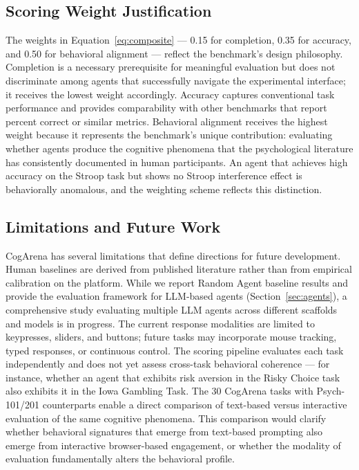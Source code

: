 \documentclass{article}
\begin{document}
\subsection{Scoring Weight Justification}

The weights in Equation~\ref{eq:composite} --- 0.15 for completion, 0.35 for accuracy, and 0.50 for behavioral alignment --- reflect the benchmark's design philosophy. Completion is a necessary prerequisite for meaningful evaluation but does not discriminate among agents that successfully navigate the experimental interface; it receives the lowest weight accordingly. Accuracy captures conventional task performance and provides comparability with other benchmarks that report percent correct or similar metrics. Behavioral alignment receives the highest weight because it represents the benchmark's unique contribution: evaluating whether agents produce the cognitive phenomena that the psychological literature has consistently documented in human participants. An agent that achieves high accuracy on the Stroop task but shows no Stroop interference effect is behaviorally anomalous, and the weighting scheme reflects this distinction.

\subsection{Limitations and Future Work}

CogArena has several limitations that define directions for future development. Human baselines are derived from published literature rather than from empirical calibration on the platform. While we report Random Agent baseline results and provide the evaluation framework for LLM-based agents (Section~\ref{sec:agents}), a comprehensive study evaluating multiple LLM agents across different scaffolds and models is in progress. The current response modalities are limited to keypresses, sliders, and buttons; future tasks may incorporate mouse tracking, typed responses, or continuous control. The scoring pipeline evaluates each task independently and does not yet assess cross-task behavioral coherence --- for instance, whether an agent that exhibits risk aversion in the Risky Choice task also exhibits it in the Iowa Gambling Task. The 30 CogArena tasks with Psych-101/201 counterparts enable a direct comparison of text-based versus interactive evaluation of the same cognitive phenomena. This comparison would clarify whether behavioral signatures that emerge from text-based prompting also emerge from interactive browser-based engagement, or whether the modality of evaluation fundamentally alters the behavioral profile.
\end{document}
